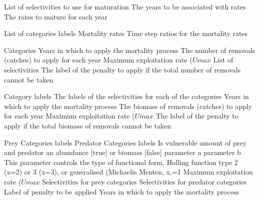  {List of selectivities to use for maturation}
 {The years to be associated with rates}
 {The rates to mature for each year}
\par\textbf{}\par
{} {List of categories labels}
 {Mortality rates}
 {Time step ratios for the mortality rates}
\par\textbf{}\par
{} {Categories}
 {Years in which to apply the mortality process}
 {The number of removals (catches) to apply for each year}
 {Maximum exploitation rate ($Umax$}
 {List of selectivities}
 {The label of the penalty to apply if the total number of removals cannot be taken}
\par\textbf{}\par
{} {Category labels}
 {The labels of the selectivities for each of the categories}
 {Years in which to apply the mortality process}
 {The biomass of removals (catches) to apply for each year}
 {Maximum exploitation rate ($Umax$}
 {The label of the penalty to apply if the total biomass of removals cannot be taken}
\par\textbf{}\par
{} {Prey Categories labels}
 {Predator Categories labels}
 {Is vulnerable amount of prey and predator an abundance [true] or biomass [false]}
 {parameter a}
 {parameter b}
 {This parameter controls the type of functional form, Holling function type 2 (x=2) or 3 (x=3), or generalised (Michaelis Menten, x,=1}
 {Maximum exploitation rate ($Umax$}
 {Selectivities for prey categories}
 {Selectivities for predator categories}
 {Label of penalty to be applied}
 {Years in which to apply the mortality process}
\par\textbf{}\par
